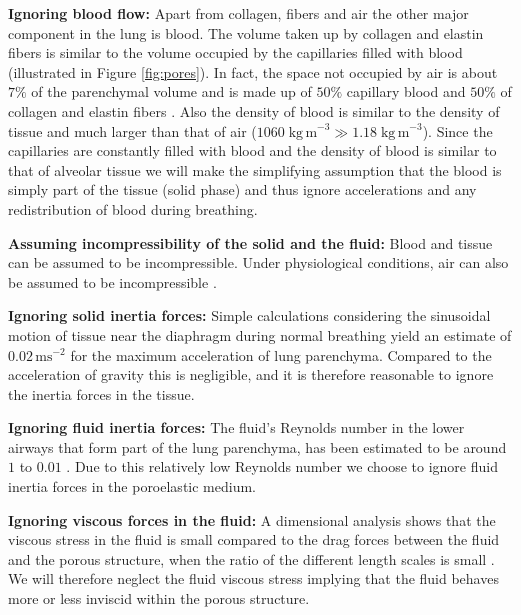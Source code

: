 \noindent \textbf{Ignoring blood flow:}\label{section:blood_flow} Apart from collagen, fibers and air the other major component in the lung is blood. The volume taken up by collagen and  elastin fibers is similar to the volume occupied by the capillaries filled with blood (illustrated in Figure \ref{fig:pores}). In fact, the space not occupied by air is about $7\%$ of the parenchymal volume and is made up of $50\%$ capillary blood and $50\%$ of collagen and elastin fibers \cite{WeichertThesis}. Also the density of blood is similar to the density of tissue and much larger than that of air ($ {1060 \;\mbox{kg}\,\mbox{m}}^{-3}\gg  {1.18 \;\mbox{kg}\,\mbox{m}}^{-3}$). Since the capillaries are constantly filled with blood and the density of blood is similar to that of alveolar tissue we will make the simplifying assumption that the blood is simply part of the tissue (solid phase) and thus ignore accelerations and any redistribution of blood during breathing.

\noindent \textbf{Assuming incompressibility of the solid and the fluid:} Blood and tissue can be assumed to be incompressible. Under physiological conditions, air can also be assumed to be incompressible \cite{ismail2013coupled}.

\noindent \textbf{Ignoring solid inertia forces:}
\label{section:inertia} Simple calculations considering the sinusoidal motion of tissue near the diaphragm during normal breathing yield an estimate of $0.02\, \mbox{ms} ^{-2}$ for the maximum acceleration of lung parenchyma. Compared to the acceleration of gravity this is negligible, and it is therefore reasonable to ignore the inertia forces in the tissue.

\noindent \textbf{Ignoring fluid inertia forces:}
The fluid's Reynolds number in the lower airways that form part of the lung parenchyma, has been estimated to be around $1$ to $0.01$ \cite{pedley1970prediction}. Due to this relatively low Reynolds number we choose to ignore fluid inertia forces in the poroelastic medium. %

\noindent \textbf{Ignoring viscous forces in the fluid:}\label{section:viscous_forces}
A dimensional analysis shows that the viscous stress in the fluid is small compared to the drag forces between the fluid and the porous structure, when the ratio of the different length scales is small \cite{markert2007constitutive}. We will therefore neglect the fluid viscous stress implying that the fluid behaves more or less inviscid within the porous structure.

